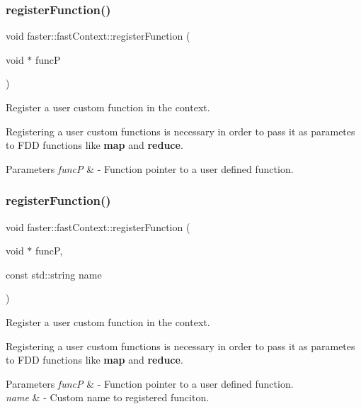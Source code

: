 \subsubsection{\texorpdfstring{register\+Function()}{registerFunction()}\hspace{0.1cm}{\footnotesize\ttfamily [1/2]}}
{\footnotesize\ttfamily void faster\+::fast\+Context\+::register\+Function (\begin{DoxyParamCaption}\item[{void $\ast$}]{funcP }\end{DoxyParamCaption})}



Register a user custom function in the context. 

Registering a user custom functions is necessary in order to pass it as parametes to F\+DD functions like {\bfseries map} and {\bfseries reduce}.


\begin{DoxyParams}{Parameters}
{\em funcP} & -\/ Function pointer to a user defined function. \\
\hline
\end{DoxyParams}
\hypertarget{classfaster_1_1fastContext_add296b9632bef0f4ceddbdc02a874bb4}{}\label{classfaster_1_1fastContext_add296b9632bef0f4ceddbdc02a874bb4} 
\subsubsection{\texorpdfstring{register\+Function()}{registerFunction()}\hspace{0.1cm}{\footnotesize\ttfamily [2/2]}}
{\footnotesize\ttfamily void faster\+::fast\+Context\+::register\+Function (\begin{DoxyParamCaption}\item[{void $\ast$}]{funcP,  }\item[{const std\+::string}]{name }\end{DoxyParamCaption})}



Register a user custom function in the context. 

Registering a user custom functions is necessary in order to pass it as parametes to F\+DD functions like {\bfseries map} and {\bfseries reduce}.


\begin{DoxyParams}{Parameters}
{\em funcP} & -\/ Function pointer to a user defined function. \\
\hline
{\em name} & -\/ Custom name to registered funciton. \\
\hline
\end{DoxyParams}
\hypertarget{classfaster_1_1fastContext_a21c563c0ba6075a6dc31faf14dccb165}{}\label{classfaster_1_1fastContext_a21c563c0ba6075a6dc31faf14dccb165} 
